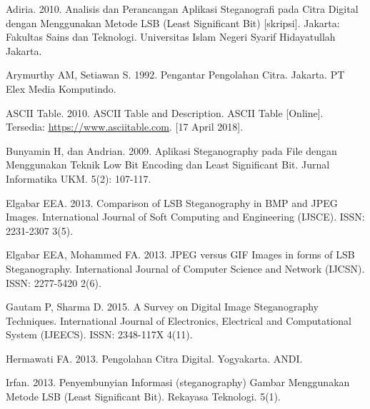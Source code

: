 \documentclass{jtetiskripsi}
\begin{document}






%
\begin{thebibliography}{99}
	 Adiria. 2010. Analisis dan Perancangan Aplikasi Steganografi pada Citra Digital dengan Menggunakan Metode LSB (Least Significant Bit) [skripsi]. Jakarta: Fakultas Sains dan Teknologi. Universitas Islam Negeri Syarif Hidayatullah Jakarta.
	
	 Arymurthy AM, Setiawan S. 1992. Pengantar Pengolahan Citra. Jakarta. PT Elex Media Komputindo.
	
	 ASCII Table.  2010. ASCII Table and Description.  ASCII Table [Online]. Tersedia: \url{https://www.asciitable.com}. [17 April 2018].
	
	 Bunyamin H, dan Andrian. 2009. Aplikasi Steganography pada File dengan Menggunakan Teknik Low Bit Encoding dan Least Significant Bit. Jurnal Informatika UKM. 5(2): 107-117.
	
	 Elgabar EEA. 2013. Comparison of LSB Steganography in BMP and JPEG Images. International Journal of Soft Computing and Engineering (IJSCE). ISSN: 2231-2307 3(5).
	
	 Elgabar EEA, Mohammed FA. 2013. JPEG versus GIF Images in forms of LSB Steganography.  International Journal of Computer Science and Network (IJCSN). ISSN: 2277-5420 2(6).
	
	 Gautam P, Sharma D. 2015. A Survey on Digital Image Steganography Techniques. International Journal of Electronics, Electrical and Computational System (IJEECS). ISSN: 2348-117X 4(11). 
	
	 Hermawati FA. 2013. Pengolahan Citra Digital. Yogyakarta. ANDI.
	
	 Irfan. 2013. Penyembunyian Informasi (steganography) Gambar Menggunakan Metode LSB (Least Significant Bit). Rekayasa Teknologi. 5(1).
	

\end{thebibliography}
\end{document}

